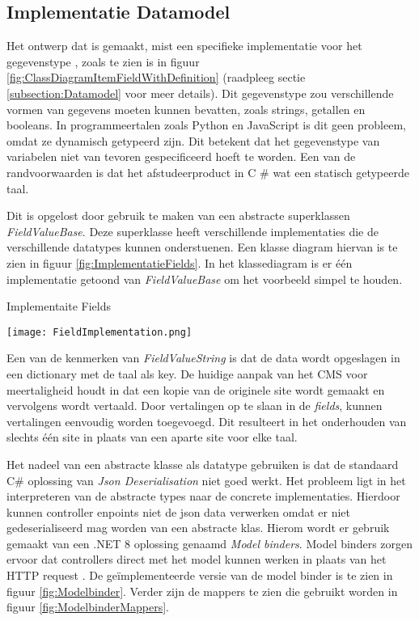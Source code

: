 \subsection{Implementatie Datamodel}
Het ontwerp dat is gemaakt, mist een specifieke implementatie voor het gegevenstype , zoals te zien is in figuur \ref{fig:ClassDiagramItemFieldWithDefinition} (raadpleeg sectie \ref{subsection:Datamodel} voor meer details).
Dit gegevenstype zou verschillende vormen van gegevens moeten kunnen bevatten, zoals strings, getallen en booleans.
In programmeertalen zoals Python en JavaScript is dit geen probleem, omdat ze dynamisch getypeerd zijn.
Dit betekent dat het gegevenstype van variabelen niet van tevoren gespecificeerd hoeft te worden.
Een van de randvoorwaarden is dat het afstudeerproduct in C \# wat een statisch getypeerde taal.

\whitespace
Dit is opgelost door gebruik te maken van een abstracte superklassen \textit{FieldValueBase}.
Deze superklasse heeft verschillende implementaties die de verschillende datatypes kunnen onderstuenen.
Een klasse diagram hiervan is te zien in figuur \ref{fig:ImplementatieFields}.
In het klassediagram is er één implementatie getoond van \textit{FieldValueBase} om het voorbeeld simpel te houden.

\whitespace
\begin{graphic}
    \captionsetup{type=figure}
    \caption{Implementaite Fields}
    \texttt{[image: FieldImplementation.png]}
    \label{fig:ImplementatieFields}
\end{graphic}

\whitespace
Een van de kenmerken van \textit{FieldValueString} is dat de data wordt opgeslagen in een dictionary met de taal als key.
De huidige aanpak van het CMS voor meertaligheid houdt in dat een kopie van de originele site wordt gemaakt en vervolgens wordt vertaald.
Door vertalingen op te slaan in de \textit{fields}, kunnen vertalingen eenvoudig worden toegevoegd.
Dit resulteert in het onderhouden van slechts één site in plaats van een aparte site voor elke taal.

\whitespace
Het nadeel van een abstracte klasse als datatype gebruiken is dat de standaard C\# oplossing van \textit{Json Deserialisation} niet goed werkt.
Het probleem ligt in het interpreteren van de abstracte types naar de concrete implementaties.
Hierdoor kunnen controller enpoints niet de json data verwerken omdat er niet gedeserialiseerd mag worden van een abstracte klas.
Hierom wordt er gebruik gemaakt van een .NET 8 oplossing genaamd \textit{Model binders}.
Model binders zorgen ervoor dat controllers direct met het model kunnen werken in plaats van het HTTP request \parencite{ModelBinders}.
De geïmplementeerde versie van de model binder is te zien in figuur \ref{fig:Modelbinder}.
Verder zijn de mappers te zien die gebruikt worden in figuur \ref{fig:ModelbinderMappers}.

